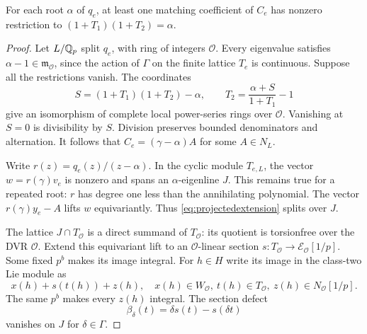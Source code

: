 \begin{lemma}\label{lem:projectedpole}
For each root $\alpha$ of $q_e$, at least one matching coefficient
of $C_e$ has nonzero restriction to
$(1+T_1)(1+T_2)=\alpha$.
\end{lemma}
\begin{proof}
Let $L/\mathbb Q_p$ split $q_e$, with ring of integers $\mathcal O$.
Every eigenvalue satisfies $\alpha-1\in\mathfrak m_{\mathcal O}$,
since the action of $\Gamma$ on the finite lattice $T_e$ is
continuous. Suppose all the restrictions vanish. The coordinates
\[
 S=(1+T_1)(1+T_2)-\alpha,\qquad
 T_2=\frac{\alpha+S}{1+T_1}-1
\]
give an isomorphism of complete local power-series rings over
$\mathcal O$. Vanishing at $S=0$ is divisibility by $S$.
Division preserves bounded denominators and alternation.
It follows that $C_e=(\gamma-\alpha)A$ for some $A\in N_L$.

Write $r(z)=q_e(z)/(z-\alpha)$. In the cyclic module $T_{e,L}$,
the vector $w=r(\gamma)v_e$ is nonzero and spans an
$\alpha$-eigenline $J$. This remains true for a repeated root:
$r$ has degree one less than the annihilating polynomial.
The vector $r(\gamma)y_e-A$ lifts $w$ equivariantly.
Thus \eqref{eq:projectedextension} splits over $J$.

The lattice $J\cap T_{\mathcal O}$ is a direct summand of
$T_{\mathcal O}$: its quotient is torsionfree over the DVR
$\mathcal O$. Extend this equivariant lift to an
$\mathcal O$-linear section
$s:T_{\mathcal O}\to\mathcal E_{\mathcal O}[1/p]$.
Some fixed $p^b$ makes its image integral. For $h\in H$ write
its image in the class-two Lie module as
\[
        x(h)+s(t(h))+z(h),\quad
 x(h)\in W_{\mathcal O},\ t(h)\in T_{\mathcal O},\
 z(h)\in N_{\mathcal O}[1/p].
\]
The same $p^b$ makes every $z(h)$ integral. The section defect
\[
        \beta_\delta(t)=\delta s(t)-s(\delta t)
\]
vanishes on $J$ for $\delta\in\Gamma$.


\end{proof}
